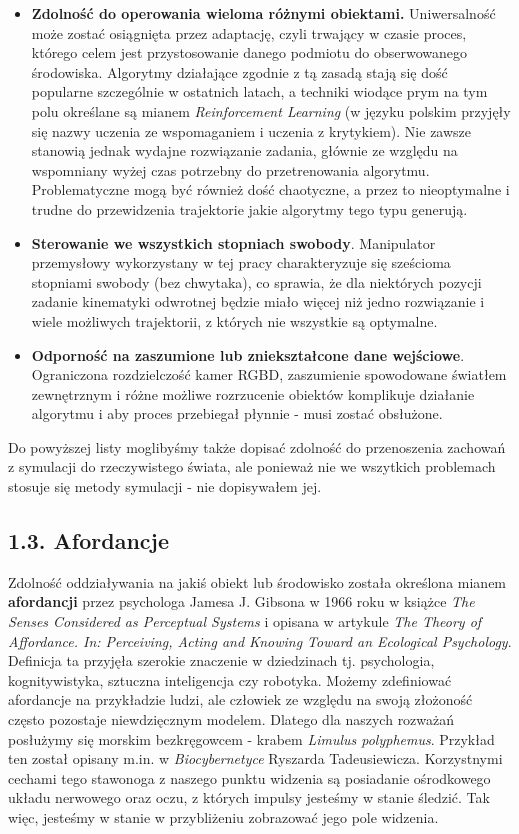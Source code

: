 \documentclass{article}
\begin{document}
\begin{itemize}
\item \textbf{Zdolność do operowania wieloma różnymi obiektami.} Uniwersalność może zostać osiągnięta przez adaptację, czyli trwający w czasie proces, którego celem jest przystosowanie danego podmiotu do obserwowanego środowiska. Algorytmy działające zgodnie z tą zasadą stają się dość popularne szczególnie w ostatnich latach, a techniki wiodące prym na tym polu określane są mianem \emph{Reinforcement Learning} (w języku polskim przyjęły się nazwy uczenia ze wspomaganiem i uczenia z krytykiem). Nie zawsze stanowią jednak wydajne rozwiązanie zadania, głównie ze względu na wspomniany wyżej czas potrzebny do przetrenowania algorytmu. Problematyczne mogą być również dość chaotyczne, a przez to nieoptymalne i trudne do przewidzenia trajektorie jakie algorytmy tego typu generują.

\item \textbf{Sterowanie we wszystkich stopniach swobody}. Manipulator przemysłowy wykorzystany w tej pracy charakteryzuje się sześcioma stopniami swobody (bez chwytaka), co sprawia, że dla niektórych pozycji zadanie kinematyki odwrotnej będzie miało więcej niż jedno rozwiązanie i wiele możliwych trajektorii, z których nie wszystkie są optymalne.

\item \textbf{Odporność na zaszumione lub zniekształcone dane wejściowe}. Ograniczona rozdzielczość kamer RGBD, zaszumienie spowodowane światłem zewnętrznym i różne możliwe rozrzucenie obiektów komplikuje działanie algorytmu i aby proces przebiegał płynnie - musi zostać obsłużone.
\end{itemize}

Do powyższej listy moglibyśmy także dopisać zdolność do przenoszenia zachowań z symulacji do rzeczywistego świata, ale ponieważ nie we wszytkich problemach stosuje się metody symulacji - nie dopisywałem jej.

\subsection*{\LARGE{1.3. Afordancje}} 

Zdolność oddziaływania na jakiś obiekt lub środowisko została określona mianem \textbf{afordancji} przez psychologa Jamesa J. Gibsona w 1966 roku w książce \emph{The Senses Considered as Perceptual Systems} i opisana w artykule \emph{The  Theory  of  Affordance.  In:  Perceiving,  Acting  and  Knowing  Toward  an Ecological Psychology}. Definicja ta przyjęła szerokie znaczenie w dziedzinach tj. psychologia, kognitywistyka, sztuczna inteligencja czy robotyka. Możemy zdefiniować afordancje na przykładzie ludzi, ale człowiek ze względu na swoją złożoność często pozostaje niewdzięcznym modelem. Dlatego dla naszych rozważań posłużymy się morskim bezkręgowcem - krabem \emph{Limulus polyphemus}. Przykład ten został opisany m.in. w \emph{Biocybernetyce} Ryszarda Tadeusiewicza. Korzystnymi cechami tego stawonoga z naszego punktu widzenia są posiadanie ośrodkowego układu nerwowego oraz oczu, z których impulsy jesteśmy w stanie śledzić. Tak więc, jesteśmy w stanie w przybliżeniu zobrazować jego pole widzenia. 
\end{document}
